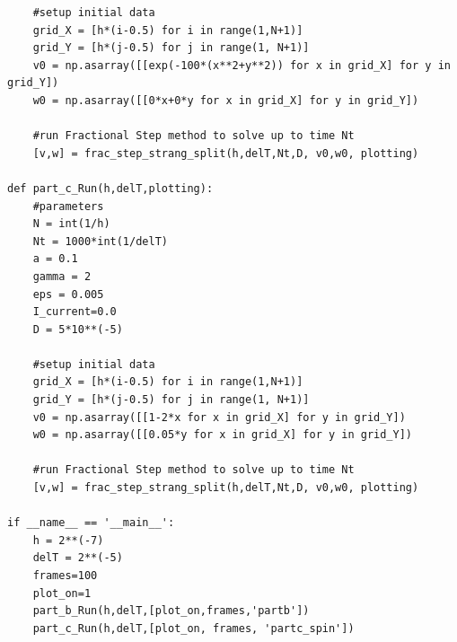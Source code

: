 \documentclass[12pt]{article}
\begin{document}
\begin{verbatim}
    #setup initial data
    grid_X = [h*(i-0.5) for i in range(1,N+1)]
    grid_Y = [h*(j-0.5) for j in range(1, N+1)]
    v0 = np.asarray([[exp(-100*(x**2+y**2)) for x in grid_X] for y in grid_Y])
    w0 = np.asarray([[0*x+0*y for x in grid_X] for y in grid_Y])
    
    #run Fractional Step method to solve up to time Nt
    [v,w] = frac_step_strang_split(h,delT,Nt,D, v0,w0, plotting)

def part_c_Run(h,delT,plotting):
    #parameters
    N = int(1/h)
    Nt = 1000*int(1/delT)
    a = 0.1
    gamma = 2
    eps = 0.005
    I_current=0.0
    D = 5*10**(-5)

    #setup initial data
    grid_X = [h*(i-0.5) for i in range(1,N+1)]
    grid_Y = [h*(j-0.5) for j in range(1, N+1)]
    v0 = np.asarray([[1-2*x for x in grid_X] for y in grid_Y])
    w0 = np.asarray([[0.05*y for x in grid_X] for y in grid_Y])
    
    #run Fractional Step method to solve up to time Nt
    [v,w] = frac_step_strang_split(h,delT,Nt,D, v0,w0, plotting)

if __name__ == '__main__':
    h = 2**(-7)
    delT = 2**(-5)
    frames=100
    plot_on=1
    part_b_Run(h,delT,[plot_on,frames,'partb'])
    part_c_Run(h,delT,[plot_on, frames, 'partc_spin'])  
\end{verbatim}
\end{document}
